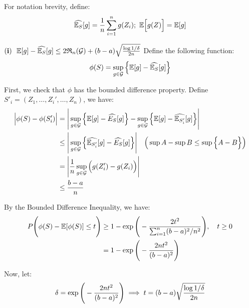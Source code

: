 \begin{proof*}
    For notation brevity, define:
    \begin{align*}
        \widehat{\E_S}[g] &= \frac{1}{n}\sum_{i=1}^n g(Z_i); \ \E\bigSquare{g(Z)} = \E[g] \\
    \end{align*}
    
    \begin{subproof}{\newline ${\bf (i)} \ \ \mathbb{E}[g] - \widehat{\mathbb{E}_S}[g] \le 2\mathfrak{R}_n(\mathcal{G}) + (b-a)\sqrt{\frac{\log1/\delta}{2n}}$}
        Define the following function:
        \begin{align*}
            \phi(S) = \sup_{g\in\mathcal{G}} \Big\{ 
                \mathbb{E}[g] - \widehat{\mathbb{E}_S}[g]
             \Big\}
        \end{align*}

        \noindent First, we check that $\phi$ has the bounded difference property. Define $S'_i=(Z_1, \dots, Z_i', \dots, Z_n)$, we have:
        \begin{align*}
            \Big| \phi(S) - \phi(S'_i) \Big| 
                &= \Bigg| 
                    \sup_{g\in\mathcal{G}} \Big\{ \mathbb{E}[g] - \widehat{E_S}[g] \Big\} - \sup_{g\in\mathcal{G}}\Big\{ \mathbb{E}[g] - \widehat{\mathbb{E}_{S_i'}}[g] \Big\}
                 \Bigg| \\
                &\le \Bigg| 
                    \sup_{g\in\mathcal{G}} \Big\{  \widehat{\mathbb{E}_{S_i'}}[g] - \widehat{E_S}[g]  \Big\}
                 \Bigg| \ \ \ \Big(\sup A - \sup B \le \sup \Big\{ A - B \Big\} \Big) \\
                &= \Bigg| 
                    \frac{1}{n} \sup_{g\in\mathcal{G}} \Big(  g(Z_i') - g(Z_i)  \Big)
                 \Bigg| \\
                &\le \frac{b-a}{n}
        \end{align*}

        \noindent By the Bounded Difference Inequality, we have:
        \begin{align*}
            P\Bigg( 
                \phi(S) - \mathbb{E}[\phi(S)] \le t
             \Bigg) &\ge 1 - \exp\Bigg( 
                -\frac{2t^2}{\sum_{i=1}^n (b - a)^2/n^2}
             \Bigg), \ \ \ t\ge 0 \\
            &= 1 - \exp\Bigg( 
                -\frac{2nt^2}{(b - a)^2}
             \Bigg)
        \end{align*}

        \noindent Now, let:
        \begin{align*}
            \delta = \exp\Bigg( 
                -\frac{2nt^2}{(b - a)^2}
             \Bigg) \implies t = (b-a)\sqrt{
                \frac{\log 1/\delta}{2n}
            }
        \end{align*}


\end{subproof}
\end{proof*}
